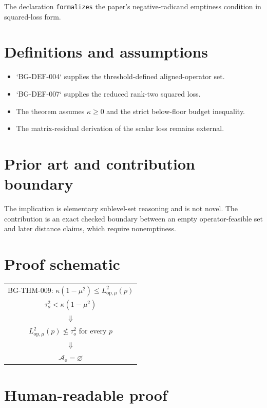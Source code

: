 \documentclass[11pt]{article}
\begin{document}
The declaration \texttt{formalizes} the paper's negative-radicand emptiness condition in
squared-loss form.

\section{Definitions and assumptions}

\begin{itemize}
 \item `BG-DEF-004` supplies the threshold-defined aligned-operator set.
 \item `BG-DEF-007` supplies the reduced rank-two squared loss.
 \item The theorem assumes $\kappa\ge0$ and the strict below-floor budget inequality.
 \item The matrix-residual derivation of the scalar loss remains external.
\end{itemize}

\section{Prior art and contribution boundary}

The implication is elementary sublevel-set reasoning and is not novel. The contribution
is an exact checked boundary between an empty operator-feasible set and later distance
claims, which require nonemptiness.

\section{Proof schematic}

\begin{center}
\begin{tabular}{c}
BG-THM-009: $\kappa(1-\mu^2)\le L_{\mathrm{op},\mu}^2(p)$ \\
$\tau_o^2<\kappa(1-\mu^2)$ \\
$\Downarrow$ \\
$L_{\mathrm{op},\mu}^2(p)\nleq\tau_o^2$ for every $p$ \\
$\Downarrow$ \\
$\mathcal A_o=\varnothing$
\end{tabular}
\end{center}

\section{Human-readable proof}
\end{document}
